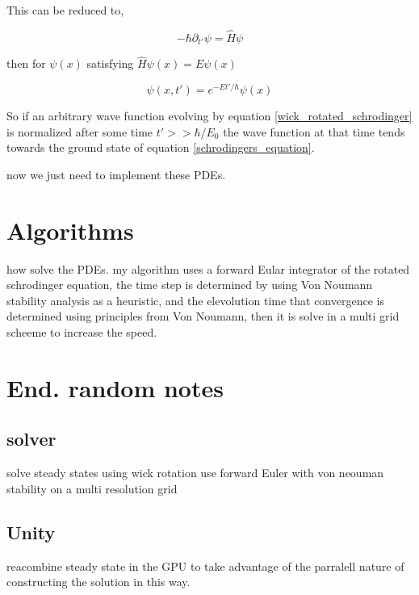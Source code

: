 \documentclass[%
 preprint,
 amsmath, amssymb, aps, pra, 10pt
]{revtex4-2}
\begin{document}
This can be reduced to,

\[
-\hbar\partial_{t'}\psi = \hat{H}\psi
\]

then for $\psi(x)$ satisfying $\hat{H}\psi(x) = E\psi(x)$

\[
\psi(x, t') = e^{-Et' / \hbar}\psi(x)
\]

So if an arbitrary wave function evolving by equation \eqref{wick_rotated_schrodinger} is normalized after some time $t' >> \hbar / E_0$ the wave function at that time tends towards the ground state of equation \eqref{schrodingers_equation}.

now we just need to implement these PDEs.

\section{Algorithms}
how solve the PDEs. my algorithm uses a forward Eular integrator of the rotated schrodinger equation, the time step is determined by using Von Noumann stability analysis as a heuristic,
and the elevolution time that convergence is determined using principles from Von Noumann, then it is solve in a multi grid scheeme to increase the speed.


\section{End. random notes}
\subsection{solver}
solve steady states using wick rotation
use forward Euler with von neouman stability
on a multi resolution grid
\subsection{Unity}
reacombine steady state in the GPU to take advantage of the parralell nature of constructing the solution in this way.
\end{document}
